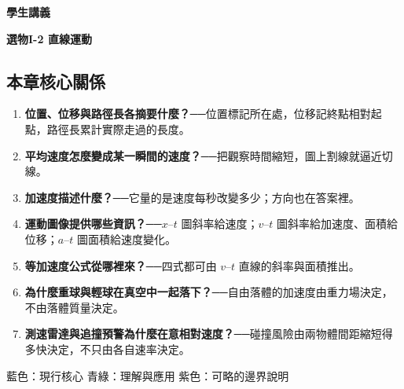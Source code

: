 \documentclass[11pt,a4paper]{article}
\providecommand{\tightlist}{%
  \setlength{\itemsep}{0pt}\setlength{\parskip}{0pt}}
\begin{document}
\begin{tcolorbox}[
  enhanced,colback=white,colframe=HandoutBlue,boxrule=1.1pt,arc=2mm,
  borderline west={3pt}{0pt}{HandoutBlue},left=5mm,right=4mm,top=4mm,bottom=4mm
]
{\sffamily\small\bfseries\color{HandoutBlue}學生講義}\par
{\sffamily\bfseries\LARGE\color{HandoutInk}選物I-2 直線運動}\par
\vspace{0.35em}{\large 從位置資料讀出速度、加速度，並預測下一秒會在哪裡}\par
{}\par
{}\par
\end{tcolorbox}


\begin{HandoutLearningMap}

\subsection{本章核心關係}\label{ux672cux7ae0ux6838ux5fc3ux95dcux4fc2}

\begin{enumerate}
\def\labelenumi{\arabic{enumi}.}
\tightlist
\item
  \textbf{位置、位移與路徑長各摘要什麼？}──位置標記所在處，位移記終點相對起點，路徑長累計實際走過的長度。
\item
  \textbf{平均速度怎麼變成某一瞬間的速度？}──把觀察時間縮短，圖上割線就逼近切線。
\item
  \textbf{加速度描述什麼？}──它量的是速度每秒改變多少；方向也在答案裡。
\item
  \textbf{運動圖像提供哪些資訊？}──\(x\text{–}t\) 圖斜率給速度；\(v\text{–}t\) 圖斜率給加速度、面積給位移；\(a\text{–}t\) 圖面積給速度變化。
\item
  \textbf{等加速度公式從哪裡來？}──四式都可由 \(v\text{–}t\) 直線的斜率與面積推出。
\item
  \textbf{為什麼重球與輕球在真空中一起落下？}──自由落體的加速度由重力場決定，不由落體質量決定。
\item
  \textbf{測速雷達與追撞預警為什麼在意相對速度？}──碰撞風險由兩物體間距縮短得多快決定，不只由各自速率決定。
\end{enumerate}

{藍色：現行核心}
{青綠：理解與應用}
{紫色：可略的邊界說明}

\end{HandoutLearningMap}
\end{document}

